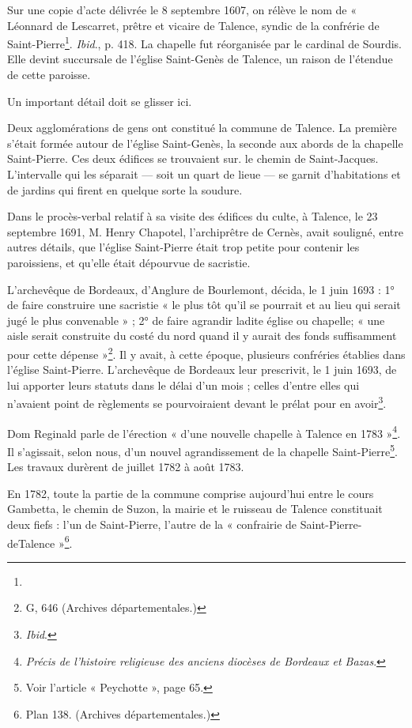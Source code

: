 \documentclass[a4paper,11pt]{book}
\begin{document}
Sur une copie d'acte délivrée le 8 septembre 1607, on rélève le nom de « Léonnard de Lescarret, prêtre et vicaire de Talence, syndic de la confrérie de Saint-Pierre\footnote{}.
\textit{Ibid}., p. 418.
La chapelle fut réorganisée par le cardinal de Sourdis. Elle devint succursale de l'église Saint-Genès de Talence, un raison de l'étendue de cette paroisse. 

Un important détail doit se glisser ici.

Deux agglomérations de gens ont constitué la commune de Talence. La première s'était formée autour de l'église Saint-Genès, la seconde aux abords de la chapelle Saint-Pierre. Ces deux édifices se trouvaient sur. le chemin de Saint-Jacques. L'intervalle qui les séparait — soit un quart de lieue — se garnit d'habitations et de jardins qui firent en quelque sorte la soudure.

Dans le procès-verbal relatif à sa visite des édifices du culte, à Talence, le 23 septembre 1691, M. Henry Chapotel, l'archiprêtre de Cernès, avait souligné, entre autres détails, que l'église Saint-Pierre était trop petite pour contenir les paroissiens, et qu'elle était dépourvue de sacristie.

L'archevêque de Bordeaux, d'Anglure de Bourlemont, décida, le 1\ier{} juin 1693 : 1° de faire construire une sacristie « le plus tôt qu'il se pourrait et au lieu qui serait jugé le plus convenable » ; 2° de faire agrandir ladite église ou chapelle; « une aisle serait construite du costé du nord quand il y aurait des fonds suffisamment pour cette dépense »\footnote{G, 646 (Archives départementales.)}. Il y avait, à cette époque, plusieurs confréries établies dans l'église Saint-Pierre. L'archevêque de Bordeaux leur prescrivit, le 1\ier{} juin 1693, de lui apporter leurs statuts dans le délai d'un mois ; celles d'entre elles qui n'avaient point de règlements se pourvoiraient devant le prélat pour en avoir\footnote{\textit{Ibid}.}.

Dom Reginald parle de l'érection « d'une nouvelle chapelle à Talence en 1783 »\footnote{\textit{Précis de l'histoire religieuse des anciens diocèses de Bordeaux et Bazas}.}. Il s'agissait, selon nous, d'un nouvel agrandissement de la chapelle Saint-Pierre\footnote{Voir l'article « Peychotte », page 65.}. Les travaux durèrent de juillet 1782 à août 1783.

En 1782, toute la partie de la commune comprise aujourd'hui entre le cours Gambetta, le chemin de Suzon, la mairie et le ruisseau de Talence constituait deux fiefs : l'un de Saint-Pierre, l'autre de la « confrairie de Saint-Pierre-deTalence »\footnote{Plan 138. (Archives départementales.)}.
\end{document}
